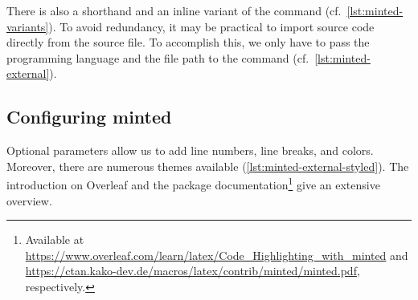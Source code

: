 \noindent There is also a shorthand and an inline variant of the command (cf.\ \cref{lst:minted-variants}).
To avoid redundancy, it may be practical to import source code directly from the source file.
To accomplish this, we only have to pass the programming language and the file path to the  command (cf.\ \cref{lst:minted-external}).


\subsection{Configuring minted}
Optional parameters allow us to add line numbers, line breaks, and colors.
Moreover, there are numerous themes available (\cref{lst:minted-external-styled}).
The introduction on Overleaf and the package documentation\footnote{Available at \url{https://www.overleaf.com/learn/latex/Code_Highlighting_with_minted} and \url{https://ctan.kako-dev.de/macros/latex/contrib/minted/minted.pdf}, respectively.} give an extensive overview.

